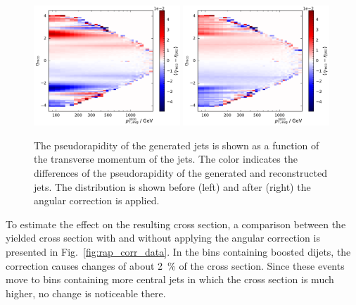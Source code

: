 \begin{figure}[htbp]
    \centering
    \includegraphics[width=0.49\textwidth]{figures/measurement/genvsreco_eta_vs_genpt.pdf}\hfill
    \includegraphics[width=0.49\textwidth]{figures/measurement/genvsreco_eta_vs_genpt_corr.pdf}
    \caption[Differences of pseudorapidity of reconstructed jets and particle-level jets as a function of the reconstructed jet \pt]
            {The pseudorapidity of the
            generated jets is shown as a function of the transverse momentum of
            the jets. The color indicates the differences of the pseudorapidity
            of the generated and reconstructed jets. The distribution is shown
            before (left) and after (right) the angular
        correction is applied.}
    \label{fig:jet_eta_corr_vs_pt}
\end{figure}

To estimate the effect on the resulting cross section, a comparison between the
yielded cross section with and without applying the angular correction is
presented in Fig.~\ref{fig:rap_corr_data}. In the bins containing boosted
dijets, the correction causes changes of about \SI{2}{\percent} of the cross
section. Since these events move to bins containing more central jets in which
the cross section is much higher, no change is noticeable there.

